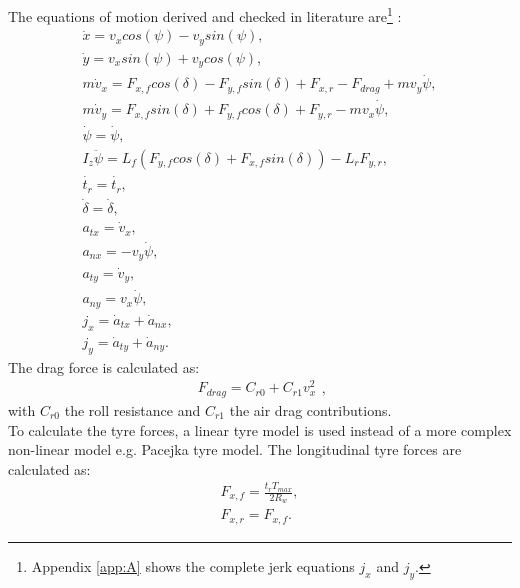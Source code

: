 The equations of motion derived and checked in literature \cite{TongDuySon2019} are\footnote{Appendix \ref{app:A} shows the complete jerk equations $j_x$ and $j_y$.} :
\begin{equation}\label{eq:bicycle_model_eqmotion}
\begin{aligned}
\dot{x} = v_x cos(\psi) - v_y sin(\psi),\\
\dot{y} = v_x sin(\psi) + v_y cos(\psi),\\
m \dot{v}_x = F_{x,f} cos(\delta) - F_{y,f} sin(\delta) + F_{x,r} - F_{drag} + m v_y \dot{\psi},\\
m \dot{v}_y = F_{x,f} sin(\delta) + F_{y,f} cos(\delta) + F_{y,r} - m v_x \dot{\psi},\\
\dot{\psi} = \dot{\psi},\\
I_z \ddot{\psi} = L_f (F_{y,f} cos(\delta) + F_{x,f} sin(\delta)) - L_r F_{y,r},\\
\dot{t_r} = \dot{t_r},\\
\dot{\delta} = \dot{\delta},\\
a_{tx} = \dot{v}_x,\\
a_{nx} = -v_y\dot{\psi},\\
a_{ty} = \dot{v}_y,\\
a_{ny} = v_x\dot{\psi},\\
j_x = \dot{a}_{tx} + \dot{a}_{nx},\\
j_y = \dot{a}_{ty} + \dot{a}_{ny}  .
\end{aligned}
\end{equation}
\newpage
The drag force is calculated as:
\begin{equation}\label{eq:bicycle_Fdrag}
\begin{aligned}
F_{drag} = C_{r0} + C_{r1} v_x^2
\end{aligned},
\end{equation}
with $C_{r0}$ the roll resistance and $C_{r1}$ the air drag contributions.\\

To calculate the tyre forces, a linear tyre model is used instead of a more complex non-linear model e.g. Pacejka tyre model. The longitudinal tyre forces are calculated as:
\begin{equation}\label{eq:bicycle_Fx}
\begin{aligned}
F_{x,f} = \frac{t_r T_{max}}{2 R_w},\\
F_{x,r} = F_{x, f}.
\end{aligned}
\end{equation}

